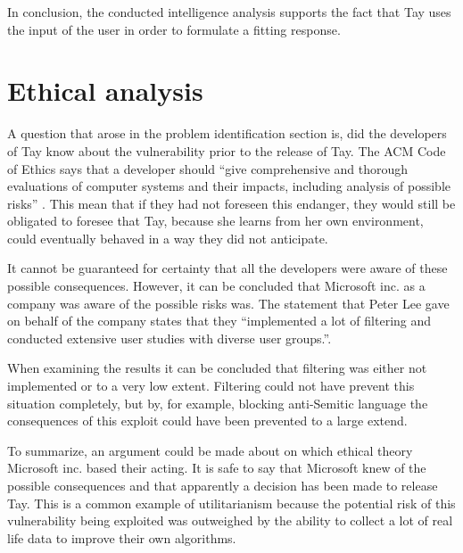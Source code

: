 In conclusion, the conducted intelligence analysis supports the fact that Tay uses the input of the user in order to formulate a fitting response.

\section{Ethical analysis}
A question that arose in the problem identification section is, did the developers of Tay know about the vulnerability prior to the release of Tay. The ACM Code of Ethics says that a developer should “give comprehensive and thorough evaluations of computer systems and their impacts, including analysis of possible risks” \cite{ACM}. This mean that if they had not foreseen this endanger, they would still be obligated to foresee that Tay, because she learns from her own environment, could eventually behaved in a way they did not anticipate.

It cannot be guaranteed for certainty that all the developers were aware of these possible consequences. However, it can be concluded that Microsoft inc. as a company was aware of the possible risks was. The statement that Peter Lee gave on behalf of the company states that they “implemented a lot of filtering and conducted extensive user studies with diverse user groups.”\cite{statementpeterlee}.

When examining the results it can be concluded that filtering was either not implemented or to a very low extent. Filtering could not have prevent this situation completely, but by, for example, blocking anti-Semitic language the consequences of this exploit could have been prevented to a  large extend.

To summarize, an argument could be made about on which ethical theory Microsoft inc. based their acting. It is safe to say that Microsoft knew of the possible consequences and that apparently a decision has been made to release Tay. This is a common example of utilitarianism because the potential risk of this vulnerability being exploited was outweighed by the ability to collect a lot of real life data to improve their own algorithms.